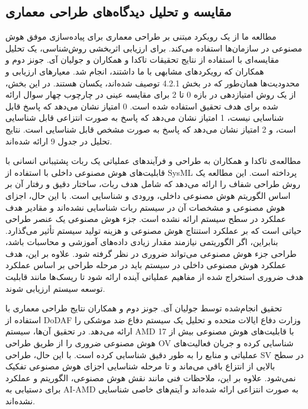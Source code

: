 \documentclass[a4paper,10pt]{article}
\begin{document}
        \subsection{مقایسه و تحلیل دیدگاه‌های طراحی معماری}

            مطالعه ما از یک رویکرد مبتنی بر طراحی معماری برای پیاده‌سازی موفق هوش مصنوعی در سازمان‌ها استفاده می‌کند. برای ارزیابی اثربخشی روش‌شناسی، یک تحلیل مقایسه‌ای با استفاده از نتایج تحقیقات تاکدا و همکاران و جولیان آی. جونز دوم و همکاران که رویکردهای مشابهی با ما داشتند، انجام شد. معیارهای ارزیابی و محدودیت‌ها همان‌طور که در بخش 4.2.1 توصیف شده‌اند، یکسان هستند. در این بخش، از یک روش امتیازدهی در بازه 0 تا 2 برای مقایسه عینی در چارچوب چهار سوال ارائه شده برای هدف تحقیق استفاده شده است. 0 امتیاز نشان می‌دهد که پاسخ قابل شناسایی نیست، 1 امتیاز نشان می‌دهد که پاسخ به صورت انتزاعی قابل شناسایی است، و 2 امتیاز نشان می‌دهد که پاسخ به صورت مشخص قابل شناسایی است. نتایج تحلیل در جدول 9 ارائه شده‌اند.

            مطالعه‌ی تاکدا و همکاران به طراحی و فرآیندهای عملیاتی یک ربات پشتیبانی انسانی با قابلیت‌های هوش مصنوعی داخلی با استفاده از SysML پرداخته است. این مطالعه یک روش طراحی شفاف را ارائه می‌دهد که شامل هدف ربات، ساختار دقیق و رفتار آن بر اساس الگوریتم هوش مصنوعی داخلی، ورودی و شناسایی است. با این حال، اجزای هوش مصنوعی و مشخصات آن در سیستم ربات شناسایی نشده‌اند و مقادیر هدف عملکرد در سطح سیستم ارائه نشده است. جزء هوش مصنوعی یک عنصر طراحی حیاتی است که بر عملکرد استنتاج هوش مصنوعی و هزینه تولید سیستم تأثیر می‌گذارد. بنابراین، اگر الگوریتمی نیازمند مقدار زیادی داده‌های آموزشی و محاسبات باشد، طراحی جزء هوش مصنوعی می‌تواند ضروری در نظر گرفته شود. علاوه بر این، هدف عملکرد هوش مصنوعی داخلی در سیستم باید در مرحله طراحی بر اساس عملکرد هدف ضروری استخراج شده از مفاهیم عملیاتی آینده ارائه شود تا ریسک‌ها مانند قابلیت توسعه سیستم ارزیابی شوند.

            تحقیق انجام‌شده توسط جولیان آی. جونز دوم و همکاران نتایج طراحی معماری با استفاده از DoDAF وزارت دفاع ایالات متحده و تحلیل یک سیستم دفاع ضد موشکی را ارائه می‌دهد. در تحقیق آن‌ها، سیستم AMD با قابلیت‌های هوش مصنوعی بیش از 17 هوش مصنوعی ضروری را از طریق طراحی OV شناسایی کرده و جریان فعالیت‌های عملیاتی و منابع را به طور دقیق شناسایی کرده است. با این حال، طراحی SV در سطح بالایی از انتزاع باقی می‌ماند و تا مرحله شناسایی اجزای هوش مصنوعی تفکیک نمی‌شود. علاوه بر این، ملاحظات فنی مانند نقش هوش مصنوعی، الگوریتم و عملکرد برای دستیابی به AI-AMD به صورت انتزاعی ارائه شده‌اند و آیتم‌های خاصی شناسایی نشده‌اند.
\end{document}
